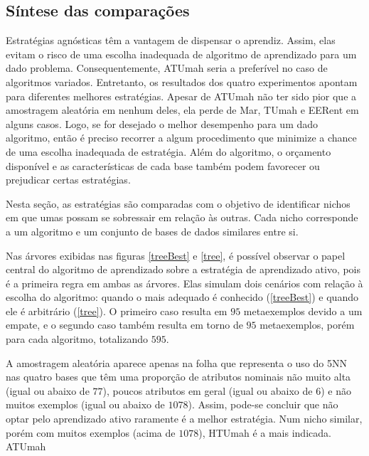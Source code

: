 \subsection{Síntese das comparações}\label{sintese}
Estratégias agnósticas têm a vantagem de dispensar o aprendiz.
Assim, elas evitam o risco de uma escolha inadequada de algoritmo de aprendizado
para um dado problema.
Consequentemente, ATUmah seria a preferível no caso de algoritmos variados.
Entretanto, os resultados dos quatro experimentos apontam para diferentes melhores
estratégias.
Apesar de ATUmah não ter sido pior que a amostragem aleatória em nenhum deles,
ela perde de Mar, TUmah e EERent em alguns casos.
Logo, se for desejado o melhor desempenho para um dado algoritmo,
então é preciso recorrer a algum procedimento que minimize a chance de
uma escolha inadequada de estratégia.
Além do algoritmo, o orçamento disponível e as características de cada base também
podem favorecer ou prejudicar certas estratégias.

Nesta seção, as estratégias são comparadas com o objetivo de identificar nichos
em que umas possam se sobressair em relação às outras.
Cada nicho corresponde a um algoritmo e um conjunto de bases de dados similares entre si.

Nas árvores exibidas nas figuras \ref{treeBest} e \ref{tree},
é possível observar o papel central do algoritmo de aprendizado sobre
a estratégia de aprendizado ativo, pois é a primeira regra em ambas as árvores.
Elas simulam dois cenários com relação à escolha do algoritmo: quando o mais adequado é conhecido
(\ref{treeBest}) e quando ele é arbitrário (\ref{tree}).
O primeiro caso resulta em $95$ metaexemplos devido a um empate,
e o segundo caso também resulta em torno de $95$ metaexemplos, porém para cada algoritmo,
totalizando $595$.
% 
% 
% 
% 

A amostragem aleatória aparece apenas na folha que representa o uso do 5NN nas quatro bases que têm
uma proporção de atributos nominais não muito alta (igual ou abaixo de $77$),
poucos atributos em geral (igual ou abaixo de $6$) e não muitos exemplos (igual ou abaixo de $1078$).
Assim, pode-se concluir que não optar pelo aprendizado ativo raramente é a melhor estratégia.
Num nicho similar, porém com muitos exemplos (acima de $1078$), HTUmah é a mais indicada.
ATUmah

